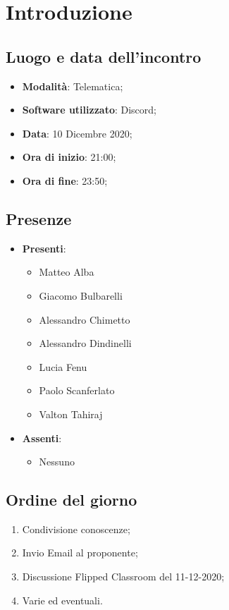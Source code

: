 \documentclass[]{article}
\begin{document}
	

	\newpage
\section{Introduzione}
\subsection{Luogo e data dell'incontro}
\begin{itemize}
	\item \textbf{Modalità}: Telematica;
	\item \textbf{Software utilizzato}: Discord;
	\item \textbf{Data}: 10 Dicembre 2020;
	\item \textbf{Ora di inizio}: 21:00;
	\item \textbf{Ora di fine}: 23:50;
\end{itemize}

\subsection{Presenze}
\begin{itemize}
	\item \textbf{Presenti}:
	\begin{itemize}
		\item Matteo Alba
		\item Giacomo Bulbarelli
		\item Alessandro Chimetto
		\item Alessandro Dindinelli
		\item Lucia Fenu
		\item Paolo Scanferlato
		\item Valton Tahiraj
	\end{itemize}
	\item \textbf{Assenti}:
	\begin{itemize}
		\item Nessuno
	\end{itemize}
\end{itemize}


\subsection{Ordine del giorno}
\begin{enumerate}
	\item Condivisione conoscenze;
	\item Invio Email al proponente;
	\item Discussione Flipped Classroom del 11-12-2020;
	\item Varie ed eventuali.
\end{enumerate}
\end{document}
